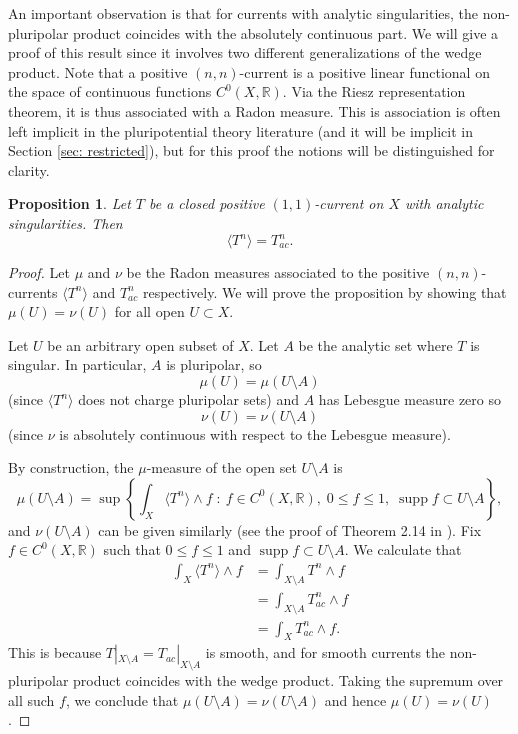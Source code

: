 \documentclass[a4paper]{amsart}
\newcommand{\R}{\mathbb{R}}
\newcommand{\supp}{\operatorname{supp}}
\newtheorem{prop}[theorem]{Proposition}
\theoremstyle{definition}
\begin{document}
An important observation is that for currents with analytic singularities, the non-pluripolar product coincides with the absolutely continuous part. We will give a proof of this result since it involves two different generalizations of the wedge product. Note that a positive $(n,n)$-current is a positive linear functional on the space of continuous functions $C^0(X, \R).$ Via the Riesz representation theorem, it is thus associated with a Radon measure. This is association is often left implicit in the pluripotential theory literature (and it will be implicit in Section \ref{sec: restricted}), but for this proof the notions will be distinguished for clarity.
\begin{prop}\label{prop: npp=ac}
	Let $T$ be a closed positive $(1, 1)$-current on $X$ with analytic singularities. Then
	\[\langle T^n\rangle = T_{ac}^n.\]
\end{prop}
\begin{proof}
	Let $\mu$ and $\nu$ be the Radon measures associated to the positive $(n, n)$-currents $\langle T^n\rangle$ and $T_{ac}^n$ respectively. We will prove the proposition by showing that $\mu(U) = \nu(U)$ for all open $U\subset X$.

Let $U$ be an arbitrary open subset of $X$. Let $A$ be the analytic set where $T$ is singular. In particular, $A$ is pluripolar, so
\[\mu(U) = \mu(U \setminus A)\]
(since $\langle T^n\rangle$ does not charge pluripolar sets) and $A$ has Lebesgue measure zero so \[\nu(U) = \nu(U\setminus A)\] (since $\nu$ is absolutely continuous with respect to the Lebesgue measure).

By construction, the $\mu$-measure of the open set $U\setminus A$ is 
\[\mu(U \setminus A) = \sup\left\{\int_X \langle T^n\rangle \wedge f\;:\: f\in C^0(X, \R), \; 0\le f\le 1,\; \supp f \subset U\setminus A\right\},\]
and $\nu(U\setminus A)$ can be given similarly (see the proof of Theorem 2.14 in \cite{Rudin}). Fix $f\in C^0(X, \R)$ such that $0\le f\le 1$ and $\supp f \subset U\setminus A$. We calculate that
\begin{align*}
    \int_X \langle T^n\rangle \wedge f &= \int_{X\setminus A} T^n \wedge f\\
    &= \int_{X\setminus A} T^n_{ac} \wedge f\\
    &= \int_X T^n_{ac} \wedge f.
\end{align*}
This is because $T|_{X\setminus A} = T_{ac}|_{X\setminus A}$ is smooth, and for smooth currents the non-pluripolar product coincides with the wedge product. Taking the supremum over all such $f$, we conclude that $\mu(U\setminus A) = \nu(U\setminus A)$ and hence $\mu(U) = \nu(U)$.
\end{proof}
\end{document}
